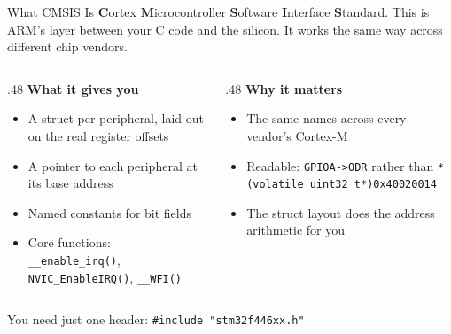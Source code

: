 \documentclass[9pt,aspectratio=169,xcolor=table]{beamer}
\begin{document}
\begin{frame}{What CMSIS Is}
    \leavevmode
    {\small \textbf{C}ortex \textbf{M}icrocontroller \textbf{S}oftware
    \textbf{I}nterface \textbf{S}tandard. This is ARM's layer between
    your C code and the silicon. It works the same way across
    different chip vendors.}

    \vspace{3mm}
    \begin{columns}[T]
    \begin{column}{.48\textwidth}
        \textbf{What it gives you}
        {\small
        \begin{itemize}\itemsep1pt
            \item A \alert{struct} per peripheral, laid out on the real register
                  offsets
            \item A \alert{pointer} to each peripheral at its base address
            \item Named constants for bit fields
            \item Core functions: \texttt{\_\_enable\_irq()},
                  \texttt{NVIC\_EnableIRQ()}, \texttt{\_\_WFI()}
        \end{itemize}}
    \end{column}
    \begin{column}{.48\textwidth}
        \textbf{Why it matters}
        {\small
        \begin{itemize}\itemsep1pt
            \item The \alert{same names} across every vendor's Cortex-M
            \item Readable: \texttt{GPIOA->ODR} rather than
                  \texttt{*(volatile uint32\_t*)0x40020014}
            \item The struct layout does the address arithmetic for you
        \end{itemize}}
    \end{column}
    \end{columns}

    \vspace{2mm}
    {\small You need just one header: \texttt{\#include "stm32f446xx.h"}}
\end{frame}
\end{document}
